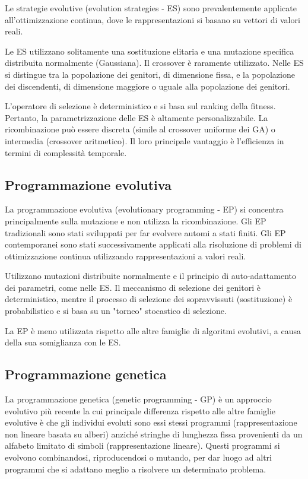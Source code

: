 Le strategie evolutive (evolution strategies - ES) sono prevalentemente applicate all'ottimizzazione continua, dove le rappresentazioni si basano su vettori di valori reali.

Le ES utilizzano solitamente una sostituzione elitaria e una mutazione specifica distribuita normalmente (Gaussiana). Il crossover è raramente utilizzato. Nelle ES si distingue tra la popolazione dei genitori, di dimensione fissa, e la popolazione dei discendenti, di dimensione maggiore o uguale alla popolazione dei genitori. 

L'operatore di selezione è deterministico e si basa sul ranking della fitness. Pertanto, la parametrizzazione delle ES è altamente personalizzabile. La ricombinazione può essere discreta (simile al crossover uniforme dei GA) o intermedia (crossover aritmetico). Il loro principale vantaggio è l'efficienza in termini di complessità temporale.

\subsection{Programmazione evolutiva}

La programmazione evolutiva (evolutionary programming - EP) si concentra principalmente sulla mutazione e non utilizza la ricombinazione. Gli EP tradizionali sono stati sviluppati per far evolvere automi a stati finiti. Gli EP contemporanei sono stati successivamente applicati alla risoluzione di problemi di ottimizzazione continua utilizzando rappresentazioni a valori reali.

Utilizzano mutazioni distribuite normalmente e il principio di auto-adattamento dei parametri, come nelle ES. Il meccanismo di selezione dei genitori è deterministico, mentre il processo di selezione dei sopravvissuti (sostituzione) è probabilistico e si basa su un "torneo" stocastico di selezione.

La EP è meno utilizzata rispetto alle altre famiglie di algoritmi evolutivi, a causa della sua somiglianza con le ES.

\subsection{Programmazione genetica}

La programmazione genetica (genetic programming - GP) è un approccio evolutivo più recente la cui principale differenza rispetto alle altre famiglie evolutive è che gli individui evoluti sono essi stessi programmi (rappresentazione non lineare basata su alberi) anziché stringhe di lunghezza fissa provenienti da un alfabeto limitato di simboli (rappresentazione lineare). Questi programmi si evolvono combinandosi, riproducendosi o mutando, per dar luogo ad altri programmi che si adattano meglio a risolvere un determinato problema.

